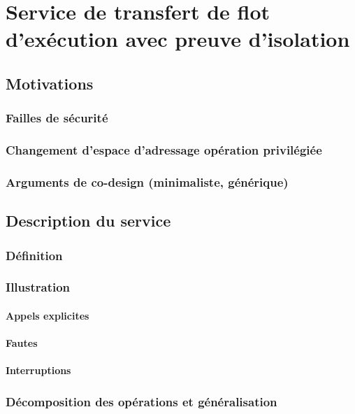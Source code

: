 \chapter{Service de transfert de flot d'exécution avec preuve d'isolation}


	\section{Motivations}
		\subsection{Failles de sécurité}
		\subsection{Changement d'espace d'adressage opération privilégiée}
		\subsection{Arguments de co-design (minimaliste, générique)}
			

	\section{Description du service}
		\subsection{Définition}
		\subsection{Illustration}
			\subsubsection{Appels explicites}
			\subsubsection{Fautes}
			\subsubsection{Interruptions}

		\subsection{Décomposition des opérations et généralisation}

